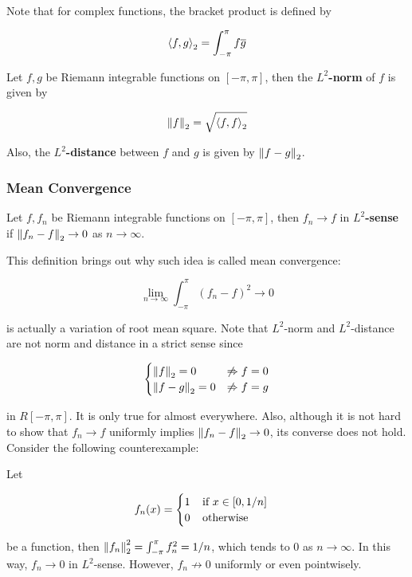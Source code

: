 \documentclass[a4paper,12pt]{article}
\begin{document}
Note that for complex functions, the bracket product is defined by

$$\left\langle f,g\right\rangle_{2}=\int_{-\pi}^{\pi}f\overline{g}$$\s

\begin{dft}
  Let $f,g$ be Riemann integrable functions on $[-\pi,\pi]$, then the \textbf{$L^{2}$-norm} of $f$ is given by

  $$\left\| f\right\|_{2}=\sqrt{\left\langle f,f\right\rangle_{2}}$$\s

  Also, the \textbf{$L^{2}$-distance} between $f$ and $g$ is given by $\left\| f-g\right\|_{2}$.
\end{dft}

\subsubsection{Mean Convergence}
\begin{dft}
  Let $f,f_{n}$ be Riemann integrable functions on $[-\pi,\pi]$, then $f_{n}\to f$ in \textbf{$L^{2}$-sense} if $\left\| f_{n}-f\right\|_{2}\to 0$ as $n\to\infty$.
\end{dft}\n

This definition brings out why such idea is called mean convergence:

$$\lim_{n\to\infty}\int_{-\pi}^{\pi}(f_{n}-f)^{2}\to 0$$\s

is actually a variation of root mean square. Note that $L^{2}$-norm and $L^{2}$-distance are not norm and distance in a strict sense since

$$\begin{cases}
  \left\| f\right\|_{2}=0&\not\Rightarrow f=0\\
  \left\| f-g\right\|_{2}=0&\not\Rightarrow f=g
\end{cases}$$\s

in $R[-\pi,\pi]$. It is only true for almost everywhere. Also, although it is not hard to show that $f_{n}\to f$ uniformly implies $\left\| f_{n}-f\right\|_{2}\to 0$, its converse does not hold. Consider the following counterexample:\n

\begin{exm}
  Let

  $$f_{n}(x)=\begin{cases}
    1\;\;\;\;\text{if }x\in[0,1/n]\\
    0\;\;\;\;\text{otherwise}
  \end{cases}$$\s

  be a function, then $\left\| f_{n}\right\|_{2}^{2}=\int_{-\pi}^{\pi}f_{n}^{2}=1/n$, which tends to $0$ as $n\to\infty$. In this way, $f_{n}\to 0$ in $L^{2}$-sense. However, $f_{n}\not\to 0$ uniformly or even pointwisely.
\end{exm}
\end{document}
